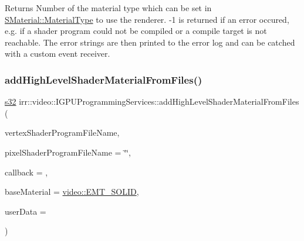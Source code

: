 \begin{DoxyReturn}{Returns}
Number of the material type which can be set in \hyperlink{classirr_1_1video_1_1SMaterial_a8cb63ab4b49ae1c61fbca8353e6b2f8a}{S\+Material\+::\+Material\+Type} to use the renderer. -\/1 is returned if an error occured, e.\+g. if a shader program could not be compiled or a compile target is not reachable. The error strings are then printed to the error log and can be catched with a custom event receiver. 
\end{DoxyReturn}
\mbox{\label{classirr_1_1video_1_1IGPUProgrammingServices_a6ad72d2498a05669231531d54d849655}} 
\subsubsection{\texorpdfstring{add\+High\+Level\+Shader\+Material\+From\+Files()}{addHighLevelShaderMaterialFromFiles()}\hspace{0.1cm}{\footnotesize\ttfamily [3/8]}}
{\footnotesize\ttfamily \hyperlink{namespaceirr_ac66849b7a6ed16e30ebede579f9b47c6}{s32} irr\+::video\+::\+I\+G\+P\+U\+Programming\+Services\+::add\+High\+Level\+Shader\+Material\+From\+Files (\begin{DoxyParamCaption}\item[{const \hyperlink{namespaceirr_1_1io_a6468281622ce3a1c46b72e19f32dded5}{io\+::path} \&}]{vertex\+Shader\+Program\+File\+Name,  }\item[{const \hyperlink{namespaceirr_1_1io_a6468281622ce3a1c46b72e19f32dded5}{io\+::path} \&}]{pixel\+Shader\+Program\+File\+Name = {\ttfamily \char`\"{}\char`\"{}},  }\item[{\hyperlink{classirr_1_1video_1_1IShaderConstantSetCallBack}{I\+Shader\+Constant\+Set\+Call\+Back} $\ast$}]{callback = {},  }\item[{\hyperlink{namespaceirr_1_1video_ac8e9b6c66f7cebabd1a6d30cbc5430f1}{E\+\_\+\+M\+A\+T\+E\+R\+I\+A\+L\+\_\+\+T\+Y\+PE}}]{base\+Material = {\ttfamily \hyperlink{namespaceirr_1_1video_ac8e9b6c66f7cebabd1a6d30cbc5430f1aa0b13db05ac3b5f40e692769de202660}{video\+::\+E\+M\+T\+\_\+\+S\+O\+L\+ID}},  }\item[{\hyperlink{namespaceirr_ac66849b7a6ed16e30ebede579f9b47c6}{s32}}]{user\+Data = {} }\end{DoxyParamCaption})\hspace{0.3cm}{\ttfamily [inline]}}



